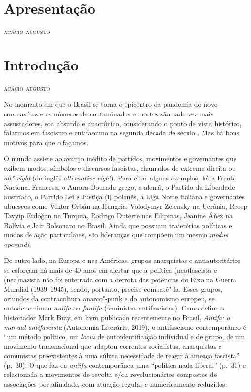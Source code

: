 
\chapter[Apresentação]{Apresentação }

\hfill{}\textsc{acácio augusto}

\bigskip

\lipsum[5]
\lipsum[2]
\lipsum[1]

\chapter[Introdução]{Introdução }

\hfill{}\textsc{acácio augusto}

\bigskip

No momento em que o Brasil se torna o epicentro da pandemia do novo
coronavírus e os números de contaminados e mortos são cada vez mais
assustadores, soa absurdo e anacrônico, considerando o ponto de vista
histórico, falarmos em fascismo e antifascimo na segunda década de
século . Mas há bons motivos para que o façamos.

O mundo assiste ao avanço inédito de partidos, movimentos e governantes
que exibem modos, símbolos e discursos fascistas, chamados de extrema
direita ou \emph{alt"-right} (do inglês \emph{alternative right}). Para
citar alguns exemplos, há a Frente Nacional Francesa, o Aurora Dourada
grego, a  alemã, o Partido da Liberdade austríaco, o Partido Lei e
Justiça (i) polonês, a Liga Norte italiana e governantes ubuescos como
Viktor Orbán na Hungria, Volodymyr Zelensky na Ucrânia, Recep Tayyip
Erdoğan na Turquia, Rodrigo Duterte nas Filipinas, Jeanine Áñez na
Bolívia e Jair Bolsonaro no Brasil. Ainda que possuam trajetórias
políticas e modos de ação particulares, são lideranças que compõem um
mesmo \emph{modus operandi}.

De outro lado, na Europa e nas Américas, grupos anarquistas e
antiautoritários se esforçam há mais de 40 anos em alertar que a
política (neo)fascista e (neo)nazista não foi enterrada com a derrota
das potências do Eixo na  Guerra Mundial (1939--1945), sendo, portanto,
preciso combatê"-la. Esses grupos, oriundos da contracultura anarco"-punk
e do autonomismo europeu, se autodenominam \emph{antifa} ou
\emph{fantifa} (feministas antifascistas). Como define o historiador
Mark Bray, em livro publicado recentemente no Brasil, \emph{Antifa: o manual
antifascista} (Autonomia Literária, 2019), o antifascismo contemporâneo
é ``um método político, um \emph{locus} de autoidentificação individual e de
grupo, de um movimento transnacional que adaptou correntes socialistas,
anarquistas e comunistas preexistentes à uma súbita necessidade de
reagir à ameaça fascista'' (p.~30). O que faz da \emph{antifa}
contemporânea uma ``política nada liberal'' (p.~31) e relacionada a
movimentos de revolta e/ou revolucionários compostos de associações por
afinidade, com atuação regular e numericamente reduzidos.

